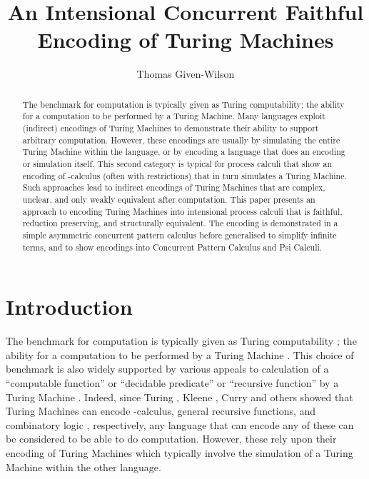 \documentclass[submission,copyright,creativecommons]{eptcs}
\title{An Intensional Concurrent Faithful Encoding of Turing Machines}
\author{Thomas Given-Wilson
\institute{INRIA, Paris, France
\footnote{This work has been supported by the project ANR-12-IS02-001 PACE.}
}
\email{thomas.given-wilson@inria.fr}
}
\begin{document}
\makeatactive

\maketitle  

\begin{abstract}
The benchmark for computation is typically given as Turing computability;
the ability for a computation to be performed by a Turing Machine.
Many languages exploit (indirect) encodings of Turing Machines to demonstrate
their ability to support arbitrary computation.
However, these encodings are usually by simulating the entire Turing Machine
within the language, or by encoding a language that does an encoding or
simulation itself.
This second category is typical for process calculi that show an encoding of
-calculus (often with restrictions) that in turn simulates a Turing Machine.
Such approaches lead to indirect encodings of Turing Machines that are complex,
unclear, and only weakly equivalent after computation.
This paper presents an approach to encoding Turing Machines into intensional
process calculi that is faithful, reduction preserving, and structurally
equivalent.
The encoding is demonstrated in a simple asymmetric concurrent pattern calculus
before generalised to simplify infinite terms, and to show encodings into
Concurrent Pattern Calculus and Psi Calculi.
\end{abstract}

\section{Introduction}
\label{sec:intro}

The benchmark for computation is typically given as Turing computability
\cite{zbMATH02522537,Kleene52,McCarthy:1960:RFS:367177.367199,boolos2007computability};
the ability for a computation to be performed by a Turing Machine
\cite{turing36}.
This choice of benchmark is also widely supported by various appeals to
calculation of a ``computable function'' or ``decidable predicate'' or
``recursive function'' by a Turing Machine
\cite{zbMATH02522537,Kleene52,Curry58combinatorylogic,Curry72combinatorylogic,jay2011}.
Indeed, since Turing \cite{zbMATH02522537}, Kleene \cite{Kleene52}, Curry
\cite{Curry58combinatorylogic,Curry72combinatorylogic}
and others showed that Turing Machines can encode -calculus, general recursive functions, 
and combinatory logic \cite{685558}, respectively,
any language that can encode any of these can be considered to be able to
do computation.
However, these rely upon their encoding of Turing Machines which typically
involve the simulation of a Turing Machine within the other language.
\end{document}
